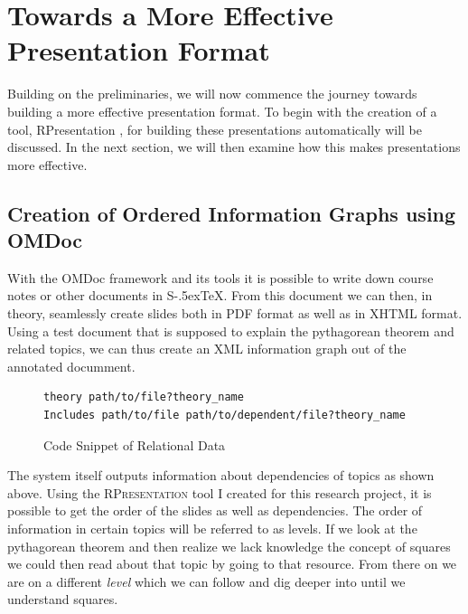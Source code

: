 \documentclass[twoside, 12pt]{article}
\def\stex{\texorpdfstring{\raisebox{-.5ex}S\kern-.5ex\TeX}{sTeX}\xspace}
\newcommand{\sys}{\textsc{RPresentation}\xspace}
\begin{document}
\section{Towards a More Effective Presentation Format}
\label{sec:TowardsAMoreEffectivePresentationFormat}

Building on the preliminaries, we will now commence the journey towards building a more effective presentation format. To begin with the creation of a tool, RPresentation \cite{npentrel:npentrel15}, for building these presentations automatically will be discussed. In the next section, we will then examine how this makes presentations more effective.  

\subsection{Creation of Ordered Information Graphs using OMDoc}
\label{sec:wp2}

With the OMDoc framework and its tools it is possible to write down course notes or other documents in \stex. From this document we can then, in theory, seamlessly create slides both in PDF format as well as in XHTML format. Using a test document that is supposed to explain the pythagorean theorem and related topics, we can thus create an XML information graph out of the annotated documment.\\

\begin{figure}
\vspace{-26pt}
\begin{verbatim}
theory path/to/file?theory_name
Includes path/to/file path/to/dependent/file?theory_name
\end{verbatim}
\vspace{-5pt}
  \caption{Code Snippet of Relational Data}
  \label{fig:SSlide}
  \vspace{12pt}
\end{figure}

\begin{figure}
\vspace{-50pt}
\end{figure}


The system itself outputs information about dependencies of topics as shown above. Using the \sys tool I created for this research project, it is possible to get the order of the slides as well as dependencies. The order of information in certain topics will be referred to as levels. If we look at the pythagorean theorem and then realize we lack knowledge the concept of squares we could then read about that topic by going to that resource. From there on we are on a different \textit{level} which we can follow and dig deeper into until we understand squares.\\
\end{document}
